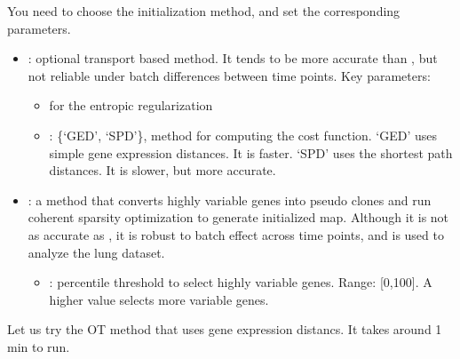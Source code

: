 \documentclass[letterpaper,10pt,english]{sphinxmanual}
\begin{document}
You need to choose the initialization method, and set the corresponding parameters.
\begin{itemize}
\item {} 
: optional transport based method. It tends to be more accurate than , but not reliable under batch differences between time points. Key parameters:
\begin{itemize}
\item {} 
 for the entropic regularization

\item {} 
: \{‘GED’, ‘SPD’\}, method for computing the cost function. ‘GED’ uses simple gene expression distances. It is faster. ‘SPD’ uses the shortest path distances. It is slower, but more accurate.

\end{itemize}

\item {} 
: a method that converts highly variable genes into pseudo clones and run coherent sparsity optimization to generate initialized map. Although it is not as accurate as , it is robust to batch effect across time points, and is used to analyze the lung dataset.
\begin{itemize}
\item {} 
: percentile threshold to select highly variable genes. Range: {[}0,100{]}. A higher value selects more variable genes.

\end{itemize}

\end{itemize}

Let us try the OT method that uses gene expression distancs. It takes around 1 min to run.
\end{document}
